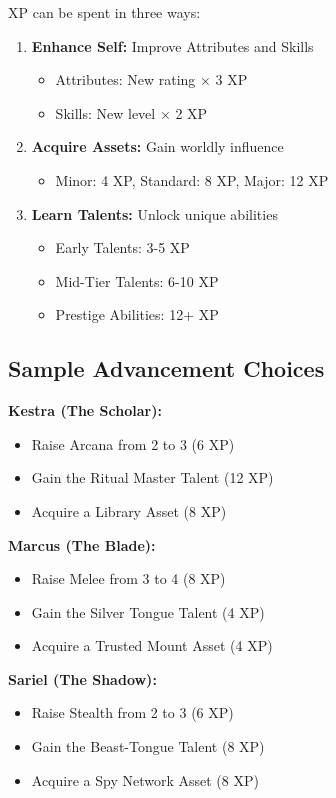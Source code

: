 \documentclass[11pt]{article}
\begin{document}
XP can be spent in three ways:
\begin{enumerate}
\item \textbf{Enhance Self:} Improve Attributes and Skills
   \begin{itemize}
   \item Attributes: New rating $\times$ 3 XP
   \item Skills: New level $\times$ 2 XP
   \end{itemize}
\item \textbf{Acquire Assets:} Gain worldly influence
   \begin{itemize}
   \item Minor: 4 XP, Standard: 8 XP, Major: 12 XP
   \end{itemize}
\item \textbf{Learn Talents:} Unlock unique abilities
   \begin{itemize}
   \item Early Talents: 3-5 XP
   \item Mid-Tier Talents: 6-10 XP
   \item Prestige Abilities: 12+ XP
   \end{itemize}
\end{enumerate}

\subsection{Sample Advancement Choices}

\textbf{Kestra (The Scholar):}
\begin{itemize}
\item Raise Arcana from 2 to 3 (6 XP)
\item Gain the Ritual Master Talent (12 XP)
\item Acquire a Library Asset (8 XP)
\end{itemize}

\textbf{Marcus (The Blade):}
\begin{itemize}
\item Raise Melee from 3 to 4 (8 XP)
\item Gain the Silver Tongue Talent (4 XP)
\item Acquire a Trusted Mount Asset (4 XP)
\end{itemize}

\textbf{Sariel (The Shadow):}
\begin{itemize}
\item Raise Stealth from 2 to 3 (6 XP)
\item Gain the Beast-Tongue Talent (8 XP)
\item Acquire a Spy Network Asset (8 XP)
\end{itemize}
\end{document}
